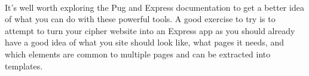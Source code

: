 \documentclass[10pt, a4paper, twosize]{article}
\begin{document}
\paragraph{} It's well worth exploring the Pug and Express documentation to get a better idea of what you can do with these powerful tools. A good exercise to try is to attempt to turn your cipher website into an Express app as you should already have a good idea of what you site should look like, what pages it needs, and which elements are common to multiple pages and can be extracted into templates.
\end{document}
